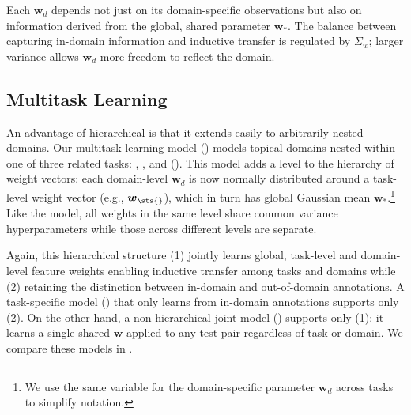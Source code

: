 Each $\boldsymbol{w}_d$ depends not just on its domain-specific
observations but also on information derived from the global, shared
parameter $\boldsymbol{w}_*$.  The balance between capturing in-domain
information and inductive transfer is regulated by $\Sigma_w$; larger
variance allows $\boldsymbol{w}_d$ more freedom to reflect the domain.


\subsection{Multitask Learning}
\label{section:approach-mtl}


An advantage of hierarchical \da{} is that it extends easily to
arbitrarily nested domains.  Our multitask learning model
() models topical domains nested
within one of three related tasks: \sts{}, \sas{}, and \asr{}
().  This model adds a level to the
hierarchy of weight vectors: each domain-level $\boldsymbol{w}_d$ is
now normally distributed around a task-level weight vector (e.g.,
$\boldsymbol{w}_{\sts{}}$), which in turn has global Gaussian mean
$\boldsymbol{w}_*$.\footnote{We use the
same variable for the domain-specific parameter $\boldsymbol{w}_d$
across tasks to simplify notation.}  Like the \da{} model, all weights
in the same level share common variance hyperparameters while those
across different levels are separate.





Again, this hierarchical structure (1) jointly learns
global, task-level and domain-level feature weights enabling inductive
transfer among tasks and domains while (2) retaining the distinction between in-domain and
out-of-domain annotations.  A task-specific model ()
that only learns from in-domain annotations supports only (2).  On the
other hand, a non-hierarchical joint model ()
supports only (1): it learns a single shared $\boldsymbol{w}$ applied
to any test pair regardless of task or domain.  We compare these
models in .


